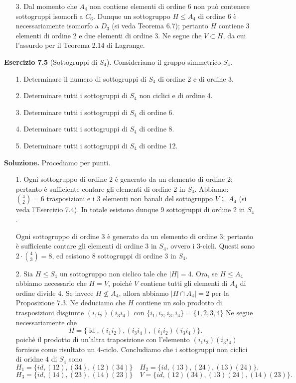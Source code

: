 \documentclass[12px]{article}
\begin{document}
{\begin{enumerate}
    \item[3.] Dal momento che $A_4$ non contiene elementi di ordine 6 non può contenere sottogruppi isomorfi a $C_6$. Dunque un sottogruppo $H \leq A_4$ di ordine 6 è necessariamente isomorfo a $D_3$ (si veda Teorema 6.7); pertanto $H$ contiene 3 elementi di ordine 2 e due elementi di ordine 3. Ne segue che $V \subset H$, da cui l'assurdo per il Teorema 2.14 di Lagrange.
\end{enumerate}
\textbf{Esercizio 7.5} (Sottogruppi di $S_4$). Consideriamo il gruppo simmetrico $S_4$.
\begin{enumerate}
    \item[1.] Determinare il numero di sottogruppi di $S_4$ di ordine 2 e di ordine 3.
    \item[2.] Determinare tutti i sottogruppi di $S_4$ non ciclici e di ordine 4.
    \item[3.] Determinare tutti i sottogruppi di $S_4$ di ordine 6.
    \item[4.] Determinare tutti i sottogruppi di $S_4$ di ordine 8.
    \item[5.] Determinare tutti i sottogruppi di $S_4$ di ordine 12.
\end{enumerate}
\textbf{Soluzione.} Procediamo per punti.
\begin{enumerate}
	\item[1.] Ogni sottogruppo di ordine 2 è generato da un elemento di ordine 2; pertanto è sufficiente contare gli elementi di ordine 2 in $S_4$. Abbiamo: $ {4 \choose 2} = 6$ trasposizioni e i 3 elementi non banali del sottogruppo $V \subseteq A_4$ (si veda l'Esercizio 7.4). In totale esistono dunque 9 sottogruppi di ordine 2 in $S_4$.

	Ogni sottogruppo di ordine 3 è generato da un elemento di ordine 3; pertanto è sufficiente contare gli elementi di ordine 3 in $S_4$, ovvero i $3$-cicli. Questi sono $2 \cdot {4 \choose 3} = 8$, ed esistono 8 sottogruppi di ordine 3 in $S_4$.

\item[2.] Sia $H \leq S_4$ un sottogruppo non ciclico tale che $\lvert H \rvert = 4$. Ora, se $H \leq A_4$ abbiamo necessario che $H = V$, poiché $V$ contiene tutti gli elementi di $A_4$ di ordine divide 4. Se invece $H \not\leq A_4$, allora abbiamo $\lvert H \cap A_4 \rvert = 2$ per la Proposizione 7.3. Ne deduciamo che $H$ contiene un solo prodotto di trasposizioni disgiunte $(i_1 i_2)(i_3 i_4)$ con $\{i_1,i_2,i_3,i_4\} = \{1,2,3,4\}$ Ne segue necessariamente che \[H = \{ \operatorname{id}, (i_1 i_2), (i_3 i_4), (i_1 i_2)(i_3 i_4)\}.\]
	poichè il prodotto di un'altra traposizione con l'elemento $(i_1i_2)(i_3i_4)$ fornisce come risultato un $4$-ciclo. Concludiamo che i sottogruppi non ciclici di oridne $4$ di $S_4$ sono
	\[
		H_1 = \{id, (12),(34),(12)(34)\}\quad H_2 = \{id, (13),(24),(13)(24)\}
	.\] 
	\[
	H_3 = \{id, (14),(23),(14)(23)\}\quad V = \{id, (12)(34),(13)(24),(14)(23)\}
	.\] 


\end{enumerate}}
\end{document}
